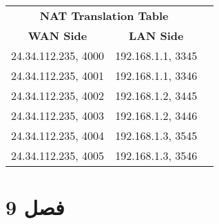\documentclass{article}
\begin{document}
\subsubsection{}
\begin{latin}
\begin{table}[H]
\begin{tabular}{|cc|l}
\cline{1-2}
\multicolumn{2}{|c|}{\textbf{NAT Translation Table}}          &  \\ \cline{1-2}
\multicolumn{1}{|c|}{\textbf{WAN Side}}   & \textbf{LAN Side} &  \\ \cline{1-2}
\multicolumn{1}{|c|}{24.34.112.235, 4000} & 192.168.1.1, 3345 &  \\ \cline{1-2}
\multicolumn{1}{|c|}{24.34.112.235, 4001} & 192.168.1.1, 3346 &  \\ \cline{1-2}
\multicolumn{1}{|c|}{24.34.112.235, 4002} & 192.168.1.2, 3445 &  \\ \cline{1-2}
\multicolumn{1}{|c|}{24.34.112.235, 4003} & 192.168.1.2, 3446 &  \\ \cline{1-2}
\multicolumn{1}{|c|}{24.34.112.235, 4004} & 192.168.1.3, 3545 &  \\ \cline{1-2}
\multicolumn{1}{|c|}{24.34.112.235, 4005} & 192.168.1.3, 3546 &  \\ \cline{1-2}
\end{tabular}
\end{table}
\end{latin}

\section{فصل 9}
\end{document}
